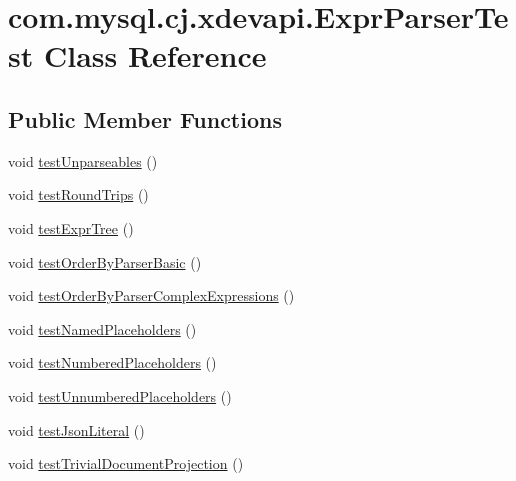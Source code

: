 \hypertarget{classcom_1_1mysql_1_1cj_1_1xdevapi_1_1_expr_parser_test}{}\section{com.\+mysql.\+cj.\+xdevapi.\+Expr\+Parser\+Test Class Reference}
\label{classcom_1_1mysql_1_1cj_1_1xdevapi_1_1_expr_parser_test}
\subsection*{Public Member Functions}
\begin{DoxyCompactItemize}
\item 
void \mbox{\hyperlink{classcom_1_1mysql_1_1cj_1_1xdevapi_1_1_expr_parser_test_a91754eb54215bd502255a907664a6f21}{test\+Unparseables}} ()
\item 
void \mbox{\hyperlink{classcom_1_1mysql_1_1cj_1_1xdevapi_1_1_expr_parser_test_a472616b8dbef32e1fb26aa421ea037dd}{test\+Round\+Trips}} ()
\item 
void \mbox{\hyperlink{classcom_1_1mysql_1_1cj_1_1xdevapi_1_1_expr_parser_test_a7e69cddec256b6dc69fb737e56161272}{test\+Expr\+Tree}} ()
\item 
void \mbox{\hyperlink{classcom_1_1mysql_1_1cj_1_1xdevapi_1_1_expr_parser_test_a170332f113cd69d799199fd7a77d3c51}{test\+Order\+By\+Parser\+Basic}} ()
\item 
void \mbox{\hyperlink{classcom_1_1mysql_1_1cj_1_1xdevapi_1_1_expr_parser_test_a11634b14b8d2f068b79e880f7b4f4c90}{test\+Order\+By\+Parser\+Complex\+Expressions}} ()
\item 
void \mbox{\hyperlink{classcom_1_1mysql_1_1cj_1_1xdevapi_1_1_expr_parser_test_ad33c986dc9b34bc0cfbdf922712c5a97}{test\+Named\+Placeholders}} ()
\item 
void \mbox{\hyperlink{classcom_1_1mysql_1_1cj_1_1xdevapi_1_1_expr_parser_test_a4e557d858128896157b3c2b1d704ab9f}{test\+Numbered\+Placeholders}} ()
\item 
void \mbox{\hyperlink{classcom_1_1mysql_1_1cj_1_1xdevapi_1_1_expr_parser_test_a22b68f3dadbce734c1cfd1d5a4ce94c2}{test\+Unnumbered\+Placeholders}} ()
\item 
void \mbox{\hyperlink{classcom_1_1mysql_1_1cj_1_1xdevapi_1_1_expr_parser_test_afbdaae4962f9db83654846d5f57144e4}{test\+Json\+Literal}} ()
\item 
void \mbox{\hyperlink{classcom_1_1mysql_1_1cj_1_1xdevapi_1_1_expr_parser_test_ab2af5663442fd83879dbff9ea644548d}{test\+Trivial\+Document\+Projection}} ()

\end{DoxyCompactItemize}
